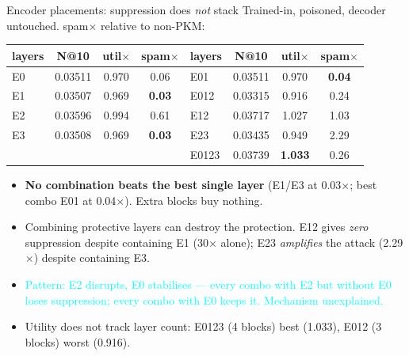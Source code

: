 \documentclass{beamer}
\newcommand{\pierre}[1]{\textcolor{cyan}{#1}}
\begin{document}
\begin{frame}{Encoder placements: suppression does \emph{not} stack}
Trained-in, poisoned, decoder untouched. spam$\times$ relative to non-PKM:
\begin{center}
\begin{tabular}{|l|c|c|c||l|c|c|c|}
\hline
layers & N@10 & util$\times$ & spam$\times$ & layers & N@10 & util$\times$ & spam$\times$ \\
\hline
E0   & 0.03511 & 0.970 & 0.06 & E01   & 0.03511 & 0.970 & \textbf{0.04} \\
E1   & 0.03507 & 0.969 & \textbf{0.03} & E012  & 0.03315 & 0.916 & 0.24 \\
E2   & 0.03596 & 0.994 & 0.61 & E12   & 0.03717 & 1.027 & \alert{1.03} \\
E3   & 0.03508 & 0.969 & \textbf{0.03} & E23   & 0.03435 & 0.949 & \alert{2.29} \\
     &         &       &      & E0123 & 0.03739 & \textbf{1.033} & 0.26 \\
\hline
\end{tabular}
\end{center}

\begin{itemize}
  \item \textbf{No combination beats the best single layer} (E1/E3 at 0.03$\times$;
        best combo E01 at 0.04$\times$). Extra blocks buy nothing.
  \item \alert{Combining protective layers can destroy the protection.} E12 gives
        \emph{zero} suppression despite containing E1 (30$\times$ alone); E23
        \emph{amplifies} the attack (2.29$\times$) despite containing E3.
  \item \pierre{Pattern: E2 disrupts, E0 stabilises --- every combo with E2 but
        without E0 loses suppression; every combo with E0 keeps it. Mechanism
        unexplained.}
  \item Utility does not track layer count: E0123 (4 blocks) best (1.033),
        E012 (3 blocks) worst (0.916).
\end{itemize}
\end{frame}
\end{document}
